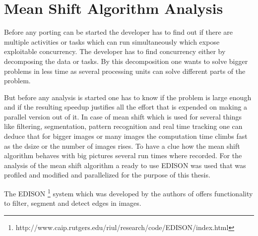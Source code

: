 \chapter{Mean Shift Algorithm Analysis} %
\label{ch:algorithm_analysis}
Before any porting can be started the developer has to find out if there are
multiple activities or tasks which can run simultaneously which expose
exploitable concurrency. The developer has to find concurrency either by
decomposing the data or tasks. By this decomposition one wants to solve bigger
problems in less time as several processing units can solve different parts of
the problem.

But before any analysis is started one has to know if the problem is large
enough and if the resulting speedup justifies all the effort that is expended on
making a parallel version out of it. In case of mean shift which is used for
several things like filtering, segmentation, pattern recognition and real time
tracking one can deduce that for bigger images or many images the computation
time climbs fast as the dsize or the number of images rises. To have a clue how
the mean shift algorithm behaves with big pictures several run times where
recorded. For the analysis of the mean shift algorithm a ready to use
\gls{EDISON} was used that was profiled and modified and parallelized for the
purpose of this thesis.

The \gls{EDISON}
\footnote{http://www.caip.rutgers.edu/riul/research/code/EDISON/index.html}
system which was developed by the authors
\citeauthor{citeulike:462300} of \citep{citeulike:462300} offers
functionality to filter, segment and detect edges in images.
 
